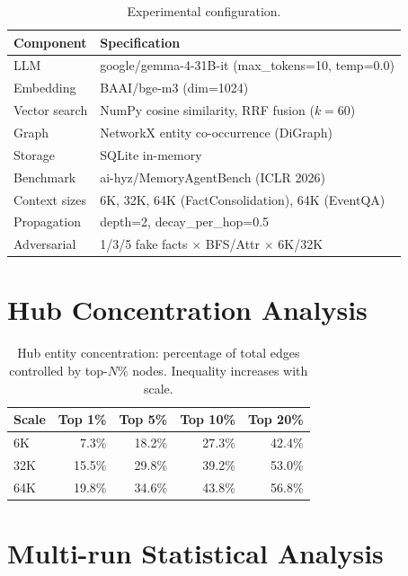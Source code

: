 \documentclass[11pt]{article}
\begin{document}
\begin{table}[htbp]
\centering
\small
\begin{tabular}{ll}
\toprule
\textbf{Component} & \textbf{Specification} \\
\midrule
LLM & google/gemma-4-31B-it (max\_tokens=10, temp=0.0) \\
Embedding & BAAI/bge-m3 (dim=1024) \\
Vector search & NumPy cosine similarity, RRF fusion ($k=60$) \\
Graph & NetworkX entity co-occurrence (DiGraph) \\
Storage & SQLite in-memory \\
Benchmark & ai-hyz/MemoryAgentBench (ICLR 2026) \\
Context sizes & 6K, 32K, 64K (FactConsolidation), 64K (EventQA) \\
Propagation & depth=2, decay\_per\_hop=0.5 \\
Adversarial & 1/3/5 fake facts $\times$ BFS/Attr $\times$ 6K/32K \\
\bottomrule
\end{tabular}
\caption{Experimental configuration.}
\label{tab:config}
\end{table}


\section{Hub Concentration Analysis}
\label{app:hub}

\begin{table}[htbp]
\centering
\small
\begin{tabular}{lrrrr}
\toprule
\textbf{Scale} & \textbf{Top 1\%} & \textbf{Top 5\%} & \textbf{Top 10\%} & \textbf{Top 20\%} \\
\midrule
6K  & 7.3\%  & 18.2\% & 27.3\% & 42.4\% \\
32K & 15.5\% & 29.8\% & 39.2\% & 53.0\% \\
64K & 19.8\% & 34.6\% & 43.8\% & 56.8\% \\
\bottomrule
\end{tabular}
\caption{Hub entity concentration: percentage of total edges controlled by top-$N$\% nodes. Inequality increases with scale.}
\label{tab:hub_concentration}
\end{table}


\section{Multi-run Statistical Analysis}
\label{app:stats}
\end{document}
